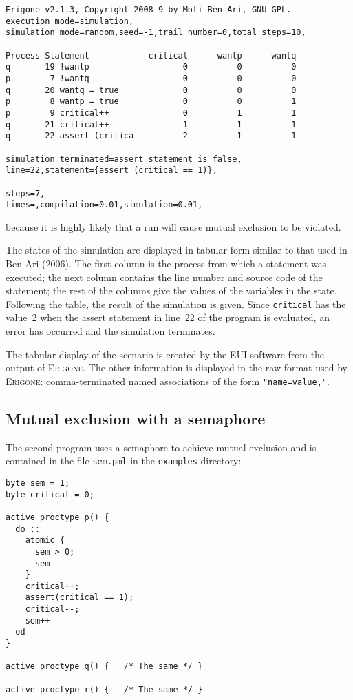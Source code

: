 \documentclass[11pt]{article}
\newcommand*{\prg}{\textsc{Erigone}}
\newcommand*{\eui}{\textsc{EUI}}
\newcommand*{\p}[1]{\texttt{#1}}
\begin{document}
\begin{verbatim}
Erigone v2.1.3, Copyright 2008-9 by Moti Ben-Ari, GNU GPL.
execution mode=simulation,
simulation mode=random,seed=-1,trail number=0,total steps=10,

Process Statement            critical      wantp      wantq 
q       19 !wantp                   0          0          0 
p        7 !wantq                   0          0          0 
q       20 wantq = true             0          0          0 
p        8 wantp = true             0          0          1 
p        9 critical++               0          1          1 
q       21 critical++               1          1          1 
q       22 assert (critica          2          1          1 

simulation terminated=assert statement is false,
line=22,statement={assert (critical == 1)},

steps=7,
times=,compilation=0.01,simulation=0.01,
\end{verbatim}
because it is highly likely that a run will cause mutual exclusion to
be violated.

The states of the simulation are displayed in tabular form similar to
that used in Ben-Ari (2006). The first column is the process from which
a statement was executed; the next column contains the line number and
source code of the statement; the rest of the columns give the values of
the variables in the state. Following the table, the result of the
simulation is given. Since \p{critical} has the value~2 when the assert
statement in line~22 of the program is evaluated, an error has occurred
and the simulation terminates.

The tabular display of the scenario is created by the \eui{} software
from the output of \prg{}. The other information is displayed in the raw
format used by \prg{}: comma-terminated named associations of the form
\p{"name=value,"}.

\subsection*{Mutual exclusion with a semaphore}

The second program uses a semaphore to achieve mutual exclusion
and is contained in the file \p{sem.pml} in the \p{examples} directory:
\begin{verbatim}
byte sem = 1;
byte critical = 0;

active proctype p() {	
  do :: 
    atomic {
      sem > 0;
      sem--
    }
    critical++;
    assert(critical == 1);
    critical--;
    sem++
  od
}

active proctype q() {	/* The same */ }

active proctype r() {	/* The same */ }	
\end{verbatim}
\end{document}
